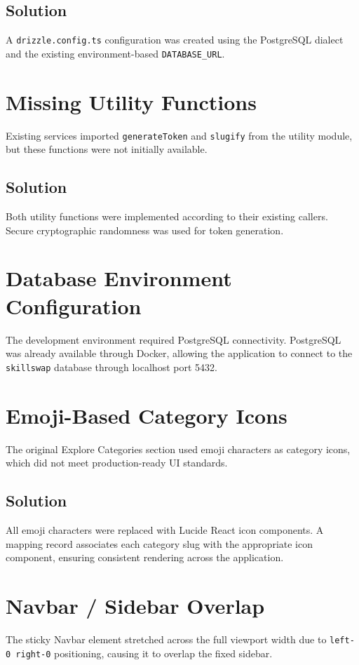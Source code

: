 \documentclass[12pt,a4paper]{report}
\begin{document}
\subsection{Solution}
A \texttt{drizzle.config.ts} configuration was created using the PostgreSQL
dialect and the existing environment-based \texttt{DATABASE\_URL}.

\section{Missing Utility Functions}
Existing services imported \texttt{generateToken} and \texttt{slugify} from the
utility module, but these functions were not initially available.

\subsection{Solution}
Both utility functions were implemented according to their existing callers.
Secure cryptographic randomness was used for token generation.

\section{Database Environment Configuration}
The development environment required PostgreSQL connectivity.  PostgreSQL was
already available through Docker, allowing the application to connect to the
\texttt{skillswap} database through localhost port 5432.

\section{Emoji-Based Category Icons}
The original Explore Categories section used emoji characters as category
icons, which did not meet production-ready UI standards.

\subsection{Solution}
All emoji characters were replaced with Lucide React icon components.  A
mapping record associates each category slug with the appropriate icon
component, ensuring consistent rendering across the application.

\section{Navbar / Sidebar Overlap}
The sticky Navbar element stretched across the full viewport width due to
\texttt{left-0 right-0} positioning, causing it to overlap the fixed sidebar.
\end{document}
